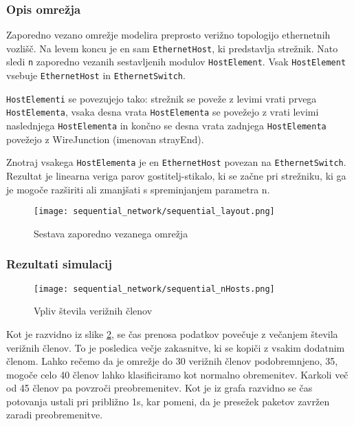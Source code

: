 \subsubsection{Opis omrežja}
Zaporedno vezano omrežje modelira preprosto verižno topologijo ethernetnih vozlišč. Na levem koncu je en sam \texttt{EthernetHost}, ki predstavlja strežnik. Nato sledi \texttt{n} zaporedno vezanih sestavljenih modulov \texttt{HostElement}. Vsak \texttt{HostElement} vsebuje \texttt{EthernetHost} in \texttt{EthernetSwitch}.

\texttt{HostElementi} se povezujejo tako: strežnik se poveže z levimi vrati prvega \texttt{HostElementa}, vsaka desna vrata \texttt{HostElementa} se povežejo z vrati levimi naslednjega \texttt{HostElementa} in končno se desna vrata zadnjega \texttt{HostElementa} povežejo z WireJunction (imenovan strayEnd).

Znotraj vsakega \texttt{HostElementa} je en \texttt{EthernetHost} povezan na \texttt{EthernetSwitch}. Rezultat je linearna veriga parov gostitelj-stikalo, ki se začne pri strežniku, ki ga je mogoče razširiti ali zmanjšati s spreminjanjem parametra n.

\begin{figure}[H]
    \centering
    \texttt{[image: sequential\_network/sequential\_layout.png]}
    \caption{Sestava zaporedno vezanega omrežja}
    \label{g05:fig:sequential-layout}
\end{figure}

\subsubsection{Rezultati simulacij}

\begin{figure}[H]
    \centering
    \texttt{[image: sequential\_network/sequential\_nHosts.png]}
    \caption{Vpliv števila verižnih členov}
    \label{g05:fig:sequential-nHosts}
\end{figure}

Kot je razvidno iz slike \ref{g05:fig:sequential-nHosts}, se čas prenosa podatkov povečuje z večanjem števila verižnih členov. To je posledica večje zakasnitve, ki se kopiči z vsakim dodatnim členom.
Lahko rečemo da je omrežje do 30 verižnih členov podobremnjeno, 35, mogoče celo 40 členov lahko klasificiramo kot normalno obremenitev. Karkoli več od 45 členov pa povzroči preobremenitev. Kot je iz grafa razvidno se čas potovanja ustali pri približno 1s, kar pomeni, da je presežek paketov zavržen zaradi preobremenitve.

